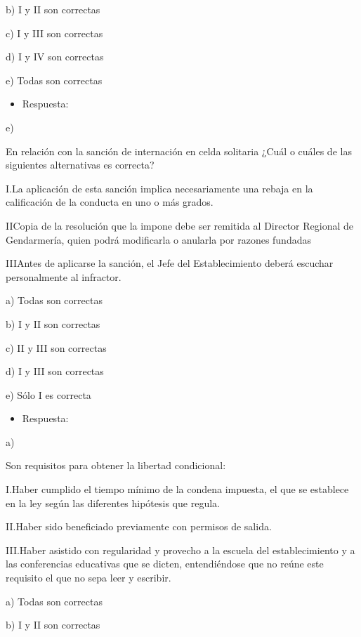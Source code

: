\documentclass[letterpaper, 11pt]{article}
\begin{document}
b) I y II son correctas

c) I y III son correctas

d) I y IV son correctas

e) Todas son correctas


\begin{itemize}
\item Respuesta:
\end{itemize}

e)


En relación con la sanción de internación en celda solitaria ¿Cuál o
cuáles de las siguientes alternativas es correcta?

I.La aplicación de esta sanción implica necesariamente una rebaja en
la calificación de la conducta en uno o más grados.



IICopia de la resolución que la impone debe ser remitida al Director
Regional de Gendarmería, quien podrá modificarla o anularla por
razones fundadas

IIIAntes de aplicarse la sanción, el Jefe del Establecimiento deberá
escuchar personalmente al infractor.


a) Todas son correctas

b) I y II son correctas

c) II y III son correctas

d) I y III son correctas

e) Sólo I es correcta



\begin{itemize}
\item Respuesta:
\end{itemize}

a)


Son requisitos para obtener la libertad condicional:


I.Haber cumplido el tiempo mínimo de la condena impuesta, el que se
establece en la ley según las diferentes hipótesis que regula.



II.Haber sido beneficiado previamente con permisos de salida.


III.Haber asistido con regularidad y provecho a la escuela del
establecimiento y a las conferencias educativas que se dicten,
entendiéndose que no reúne este requisito el que no sepa leer y
escribir.



a) Todas son correctas

b) I y II son correctas
\end{document}
